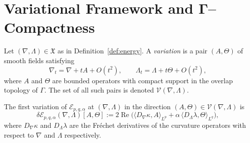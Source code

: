 
\section{Variational Framework and Γ–Compactness}
\label{sec:vol2-part3-variational}\relax\hspace{0pt}

\begin{definition}\label{def:variation-class}
Let $(\nabla,\Lambda)\in\mathfrak X$ as in Definition~\ref{def:energy}.
A \emph{variation} is a pair $(A,\Theta)$ of smooth fields satisfying
\[
\nabla_t=\nabla+\!tA+O(t^2), \qquad \Lambda_t=\Lambda+\!t\Theta+O(t^2),
\]
where $A$ and $\Theta$ are bounded operators with compact support in the overlap topology of $\Gamma$.
The set of all such pairs is denoted $\mathscr V(\nabla,\Lambda)$.
\end{definition}

\begin{definition}\label{def:first-variation}
The first variation of $\mathcal E_{p,q,\alpha}$ at $(\nabla,\Lambda)$ in the direction $(A,\Theta)\in\mathscr V(\nabla,\Lambda)$ is
\[
\delta\mathcal E_{p,q,\alpha}(\nabla,\Lambda)[A,\Theta]
:=2\operatorname{Re}\Big(
\langle D_\nabla\kappa,A\rangle_{L^p}
+\alpha\,\langle D_\Lambda\lambda,\Theta\rangle_{L^q}
\Big),
\]
where $D_\nabla\kappa$ and $D_\Lambda\lambda$ are the Fréchet derivatives of the curvature operators with respect to $\nabla$ and $\Lambda$ respectively.
\end{definition}

